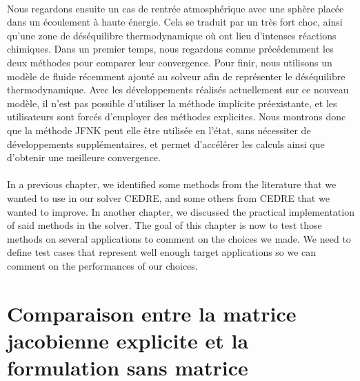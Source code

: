 \begin{tcolorbox}[title=Résumé du chapitre : Analyse de la méthode JFNK dans CEDRE, colframe=black!50!white]
  \paragraph{}
  Nous regardons ensuite un cas de rentrée atmosphérique avec une sphère placée dans un écoulement à haute énergie.
  Cela se traduit par un très fort choc, ainsi qu'une zone de déséquilibre thermodynamique où ont lieu d'intenses réactions chimiques.
  Dans un premier temps, nous regardons comme précédemment les deux méthodes pour comparer leur convergence.
  Pour finir, nous utilisons un modèle de fluide récemment ajouté au solveur afin de représenter le déséquilibre thermodynamique.
  Avec les développements réalisés actuellement sur ce nouveau modèle, il n'est pas possible d'utiliser la méthode implicite préexistante, et les utilisateurs sont forcés d'employer des méthodes explicites.
  Nous montrons donc que la méthode JFNK peut elle être utilisée en l'état, sans nécessiter de développements supplémentaires, et permet d'accélérer les calculs ainsi que d'obtenir une meilleure convergence.
\end{tcolorbox}


  \paragraph{}
  In a previous chapter, we identified some methods from the literature that we wanted to use in our solver CEDRE, and some others from CEDRE that we wanted to improve.
  In another chapter, we discussed the practical implementation of said methods in the solver.
  The goal of this chapter is now to test those methods on several applications to comment on the choices we made.
  We need to define test cases that represent well enough target applications so we can comment on the performances of our choices.


  \section{Comparaison entre la matrice jacobienne explicite et la formulation sans matrice}

